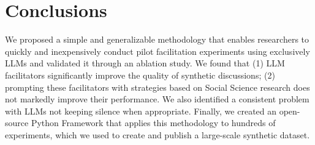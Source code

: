 %
\section{Conclusions}

We proposed a simple and generalizable methodology that enables researchers to quickly and inexpensively conduct pilot facilitation experiments using exclusively LLMs and validated it through an ablation study. We found that (1) LLM facilitators significantly improve the quality of synthetic discussions; (2) prompting these facilitators with strategies based on Social Science research does not markedly improve their performance. We also identified a consistent problem with LLMs not keeping silence when appropriate. Finally, we created an open-source Python Framework that applies this methodology to hundreds of experiments, which we used to create and publish a large-scale synthetic dataset.